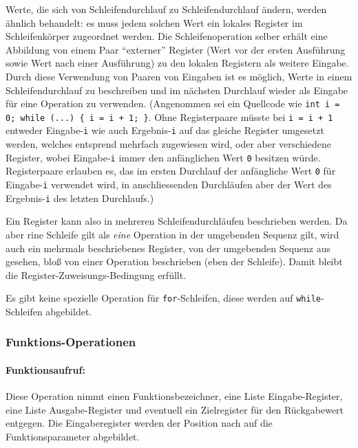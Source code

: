 \documentclass[twoside,a4paper,fleqn,12pt]{book}
\begin{document}
Werte, die sich von Schleifendurchlauf zu Schleifendurchlauf ändern, werden ähnlich behandelt: es muss jedem solchen Wert ein lokales
Register im Schleifenkörper zugeordnet werden. Die Schleifenoperation selber erhält eine Abbildung von einem Paar "`externer"' Register
(Wert vor der ersten Ausführung sowie Wert nach einer Ausführung) zu den lokalen Registern als weitere Eingabe.
Durch diese Verwendung von Paaren von Eingaben ist es möglich, Werte in einem Schleifendurchlauf zu beschreiben
und im nächsten Durchlauf wieder als Eingabe für eine Operation zu verwenden. (Angenommen sei ein Quellcode wie 
\texttt{int i = 0; while (...) \{ i = i + 1; \}}. Ohne Registerpaare müsste bei \texttt{i = i + 1} entweder Eingabe-\texttt{i}
wie auch Ergebnis-\texttt{i} auf das gleiche Register umgesetzt werden, welches entsprend mehrfach zugewiesen wird, oder aber verschiedene Register, wobei
Eingabe-\texttt{i} immer den anfänglichen Wert \texttt{0} besitzen würde. Registerpaare erlauben es, das im ersten Durchlauf
der anfängliche Wert \texttt{0} für Eingabe-\texttt{i} verwendet wird, in anschliessenden Durchläufen aber der Wert des Ergebnis-\texttt{i}
des letzten Durchlaufs.)


Ein Register kann also in mehreren Schleifendurchläufen beschrieben werden.
Da aber rine Schleife gilt als \emph{eine} Operation in der umgebenden Sequenz gilt, wird auch ein mehrmals beschriebenes Register,
von der umgebenden Sequenz aus gesehen, bloß von einer Operation beschrieben (eben der Schleife).
Damit bleibt die Register-Zuweisungs-Bedingung erfüllt.

Es gibt keine spezielle Operation für \texttt{for}-Schleifen, diese werden auf \texttt{while}-Schleifen abgebildet.

\subsubsection{Funktions-Operationen}

\paragraph{Funktionsaufruf:} Diese Operation nimmt einen Funktionsbezeichner, eine Liste Eingabe-Register, eine Liste Ausgabe-Register
und eventuell ein Zielregister für den Rückgabewert entgegen. Die Eingaberegister werden der Position nach auf die Funktionsparameter abgebildet.
\end{document}
